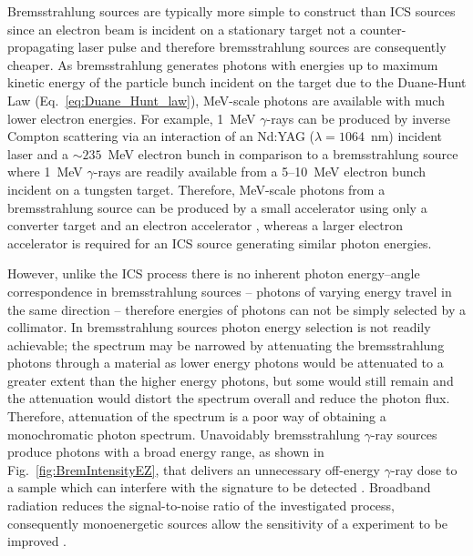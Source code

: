\documentclass[../main.tex]{subfiles}
\begin{document}
Bremsstrahlung sources are typically more simple to construct than ICS sources since an electron beam is incident on a stationary target not a counter-propagating laser pulse and therefore bremsstrahlung sources are consequently cheaper. As bremsstrahlung generates photons with energies up to maximum kinetic energy of the particle bunch incident on the target due to the Duane-Hunt Law (Eq.~\ref{eq:Duane_Hunt_law}), \si{\mega\electronvolt}-scale photons are available with much lower electron energies. For example, 1~\si{\mega\electronvolt} $\gamma$-rays can be produced by inverse Compton scattering via an interaction of an Nd:YAG ($\lambda = 1064$~\si{\nano\meter}) incident laser and a $\sim 235$~\si{\mega\electronvolt} electron bunch in comparison to a bremsstrahlung source where 1~\si{\mega\electronvolt} $\gamma$-rays are readily available from a 5--10~\si{\mega\electronvolt} electron bunch incident on a tungsten target. Therefore, \si{\mega\electronvolt}-scale photons from a bremsstrahlung source can be produced by a small accelerator using only a converter target and an electron
accelerator \cite{chin2021application}, whereas a larger electron accelerator is required for an ICS source generating similar photon energies.

However, unlike the ICS process there is no inherent photon energy--angle correspondence in bremsstrahlung sources -- photons of varying energy travel in the same direction -- therefore energies of photons can not be simply selected by a collimator. In bremsstrahlung sources photon energy selection is not readily achievable; the spectrum may be narrowed by attenuating the bremsstrahlung photons through a material as lower energy photons would be attenuated to a greater extent than the higher energy photons, but some would still remain and the attenuation would distort the spectrum overall and reduce the photon flux. Therefore, attenuation of the spectrum is a poor way of obtaining a monochromatic photon spectrum. Unavoidably bremsstrahlung $\gamma$-ray sources produce photons with a broad energy range, as shown in Fig.~\ref{fig:BremIntensityEZ}, that delivers an unnecessary off-energy $\gamma$-ray dose to a sample which can interfere with the signature to be detected \cite{geddes2017impact}. Broadband radiation reduces the signal-to-noise ratio of the investigated process, consequently monoenergetic sources allow the sensitivity of a experiment to be improved \cite{jones2008bremsstrahlung}.
\end{document}
